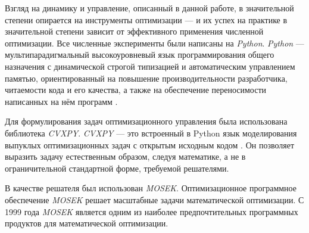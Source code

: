 \begin{comment}
		{Q}_1{N}_1\T \\0
	\end{bmatrix}\T \\ \leq  \frac{1}{\epsilon_3}\begin{bmatrix}
		{Q}_1{N}_1\T \\0
	\end{bmatrix}\begin{bmatrix}
		{Q}_1{N}_1\T \\ 0
	\end{bmatrix}\T +\epsilon_3 \begin{bmatrix}
		0 \\ {P}_2{S}{M}_1
	\end{bmatrix}\begin{bmatrix}
		0 \\ {P}_2{S}{M}_1
	\end{bmatrix}\T.
\end{multline}
%
Подставляя \eqref{eq:thm1_term_1},\eqref{eq:thm1_term_2} и \eqref{eq:thm1_term_3} в \eqref{eq:Young_expand} получаем выражение \eqref{eq:thm1_LMI_after_Young}.

\clearpage
\refstepcounter{chapter}

\end{comment}
Взгляд на динамику и управление, описанный в данной работе, в значительной степени опирается на инструменты оптимизации --- и их успех на практике в значительной степени зависит от эффективного применения численной оптимизации.
Все численные эксперименты были написаны на \textit{Python}.
\textit{Python} --- мультипарадигмальный высокоуровневый язык программирования общего назначения с динамической строгой типизацией и автоматическим управлением памятью, ориентированный на повышение производительности разработчика, читаемости кода и его качества, а также на обеспечение переносимости написанных на нём программ \cite{python}.

Для формулирования задач оптимизационного управления была использована библиотека \textit{CVXPY}.
\textit{CVXPY} --- это встроенный в Python язык моделирования выпуклых оптимизационных задач с открытым исходным кодом \cite{cvxpy}. Он позволяет выразить задачу естественным образом, следуя математике, а не в ограничительной стандартной форме, требуемой решателями.

В качестве решателя был использован \textit{MOSEK}.
Оптимизационное программное обеспечение \textit{MOSEK} \cite{mosek} решает масштабные задачи математической оптимизации. С 1999 года \textit{MOSEK} является одним из наиболее предпочтительных программных продуктов для математической оптимизации. 

